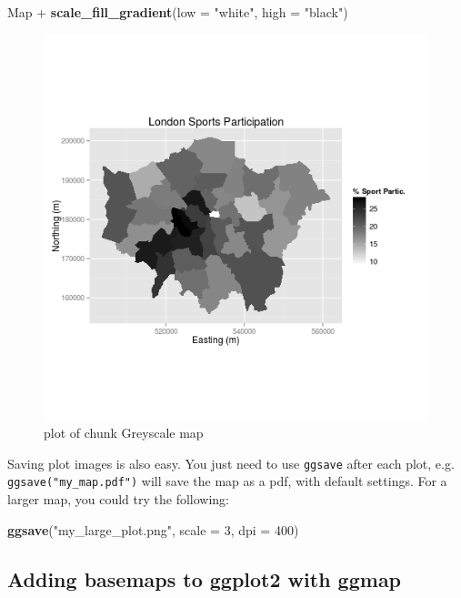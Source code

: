 \documentclass[]{article}
\makeatletter
\newenvironment{Shaded}{}{}
\newcommand{\KeywordTok}[1]{\textcolor[rgb]{0.00,0.44,0.13}{\textbf{{#1}}}}
\newcommand{\DataTypeTok}[1]{\textcolor[rgb]{0.56,0.13,0.00}{{#1}}}
\newcommand{\DecValTok}[1]{\textcolor[rgb]{0.25,0.63,0.44}{{#1}}}
\newcommand{\StringTok}[1]{\textcolor[rgb]{0.25,0.44,0.63}{{#1}}}
\newcommand{\NormalTok}[1]{{#1}}
\def\maxwidth{\ifdim\Gin@nat@width>\linewidth\linewidth
\else\Gin@nat@width\fi}
\let\Oldincludegraphics\includegraphics
\renewcommand{\includegraphics}[1]{\Oldincludegraphics[width=\maxwidth]{#1}}
\makeatother
\begin{document}
\begin{Shaded}
\begin{Highlighting}[]
\NormalTok{Map + }\KeywordTok{scale_fill_gradient}\NormalTok{(}\DataTypeTok{low =} \StringTok{"white"}\NormalTok{, }\DataTypeTok{high =} \StringTok{"black"}\NormalTok{)}
\end{Highlighting}
\end{Shaded}
\begin{figure}[htbp]
\centering
\includegraphics{figure/Greyscale_map.png}
\caption{plot of chunk Greyscale map}
\end{figure}

Saving plot images is also easy. You just need to use \texttt{ggsave}
after each plot, e.g. \texttt{ggsave("my\_map.pdf")} will save the map
as a pdf, with default settings. For a larger map, you could try the
following:

\begin{Shaded}
\begin{Highlighting}[]
\KeywordTok{ggsave}\NormalTok{(}\StringTok{"my_large_plot.png"}\NormalTok{, }\DataTypeTok{scale =} \DecValTok{3}\NormalTok{, }\DataTypeTok{dpi =} \DecValTok{400}\NormalTok{)}
\end{Highlighting}
\end{Shaded}
\subsection{Adding basemaps to ggplot2 with ggmap}
\end{document}
